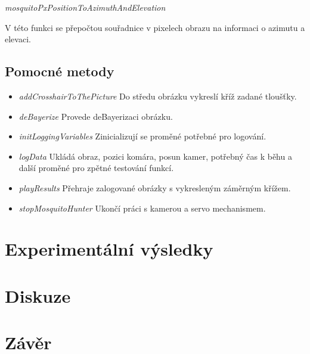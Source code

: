 \documentclass[a4paper,10pt]{article}
\begin{document}
\vspace{0.5cm}
\textit{mosquitoPxPositionToAzimuthAndElevation}

V této funkci se přepočtou souřadnice v pixelech obrazu na informaci o azimutu a elevaci.


\subsection{Pomocné metody}

\begin{itemize}
 \item \textit{addCrosshairToThePicture} Do středu obrázku vykreslí kříž zadané tloušťky. 
 \item \textit{deBayerize} Provede deBayerizaci obrázku.
\item \textit{initLoggingVariables} Zinicializují se proměné potřebné pro logování.
 \item \textit{logData} Ukládá obraz, pozici komára, posun kamer, potřebný čas k běhu a další proměné pro zpětné testování funkcí.
\item \textit{playResults} Přehraje zalogované obrázky s vykresleným záměrným křížem.
\item \textit{stopMosquitoHunter} Ukončí práci s kamerou a servo mechanismem.

\end{itemize}

\section{Experimentální výsledky}


\section{Diskuze}
\section{Závěr}
\end{document}
